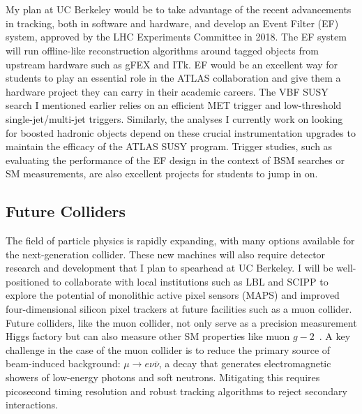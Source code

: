 \documentclass[10pt,a4paper,sans]{moderncv/moderncv} %
\begin{document}
\\
\\
My plan at UC Berkeley would be to take advantage of the recent advancements in tracking, both in software and hardware, and develop an Event Filter (EF) system, approved by the LHC Experiments Committee in 2018. The EF system will run offline-like reconstruction algorithms around tagged objects from upstream hardware such as gFEX and ITk. EF would be an excellent way for students to play an essential role in the ATLAS collaboration and give them a hardware project they can carry in their academic careers. The VBF SUSY search I mentioned earlier relies on an efficient MET trigger and low-threshold single-jet/multi-jet triggers. Similarly, the analyses I currently work on looking for boosted hadronic objects depend on these crucial instrumentation upgrades to maintain the efficacy of the ATLAS SUSY program. Trigger studies, such as evaluating the performance of the EF design in the context of BSM searches or SM measurements, are also excellent projects for students to jump in on.

\subsection{Future Colliders}
The field of particle physics is rapidly expanding, with many options available for the next-generation collider. These new machines will also require detector research and development that I plan to spearhead at UC Berkeley. I will be well-positioned to collaborate with local institutions such as LBL and SCIPP to explore the potential of monolithic active pixel sensors (MAPS) and improved four-dimensional silicon pixel trackers at future facilities such as a muon collider. Future colliders, like the muon collider, not only serve as a precision measurement Higgs factory but can also measure other SM properties like muon $g-2$~\cite{Chakraborti:2021dli}. A key challenge in the case of the muon collider is to reduce the primary source of beam-induced background: $\mu \to e \nu \bar{\nu}$, a decay that generates electromagnetic showers of low-energy photons and soft neutrons. Mitigating this requires picosecond timing resolution and robust tracking algorithms to reject secondary interactions.
\end{document}
